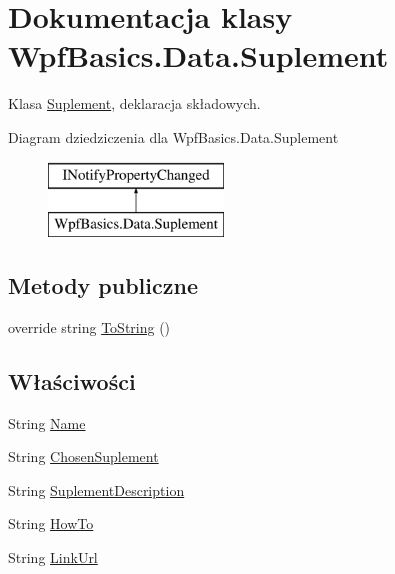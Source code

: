 \hypertarget{class_wpf_basics_1_1_data_1_1_suplement}{}\section{Dokumentacja klasy Wpf\+Basics.\+Data.\+Suplement}
\label{class_wpf_basics_1_1_data_1_1_suplement}


Klasa \hyperlink{class_wpf_basics_1_1_data_1_1_suplement}{Suplement}, deklaracja składowych.  


Diagram dziedziczenia dla Wpf\+Basics.\+Data.\+Suplement\begin{figure}[H]
\begin{center}
\leavevmode
\includegraphics[height=2.000000cm]{class_wpf_basics_1_1_data_1_1_suplement}
\end{center}
\end{figure}
\subsection*{Metody publiczne}
\begin{DoxyCompactItemize}
\item 
override string \hyperlink{class_wpf_basics_1_1_data_1_1_suplement_a1c5a542a7eb2698f1f6cf1d2ea6faa9f}{To\+String} ()
\end{DoxyCompactItemize}
\subsection*{Właściwości}
\begin{DoxyCompactItemize}
\item 
String \hyperlink{class_wpf_basics_1_1_data_1_1_suplement_aa4cc2e887ff276efe8be1cdb94a4a520}{Name}
\item 
String \hyperlink{class_wpf_basics_1_1_data_1_1_suplement_a020da06c09bf65ffcd1de13550426708}{Chosen\+Suplement}
\item 
String \hyperlink{class_wpf_basics_1_1_data_1_1_suplement_a5a13a37cdb3c962afa0142ca16056455}{Suplement\+Description}
\item 
String \hyperlink{class_wpf_basics_1_1_data_1_1_suplement_a94c12d6a1c7db2febb83883f48b259b9}{How\+To}
\item 
String \hyperlink{class_wpf_basics_1_1_data_1_1_suplement_ada9c156066a12e264b92d6f3ffd3a3f6}{Link\+Url}
\end{DoxyCompactItemize}
